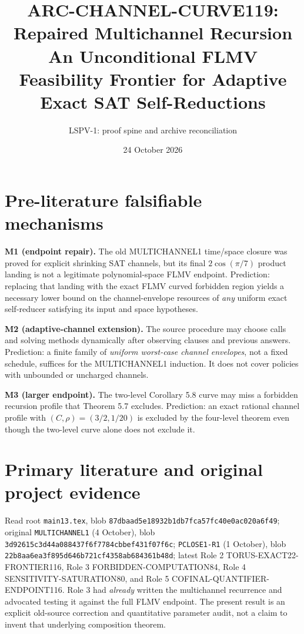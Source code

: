 \documentclass[11pt]{article}
\title{ARC-CHANNEL-CURVE119: Repaired Multichannel Recursion\\
\large An Unconditional FLMV Feasibility Frontier for Adaptive Exact SAT Self-Reductions}
\author{LSPV-1: proof spine and archive reconciliation}
\date{24 October 2026}
\begin{document}
\maketitle
\begin{center}\end{center}

\section{Pre-literature falsifiable mechanisms}
\noindent\textbf{M1 (endpoint repair).}
The old MULTICHANNEL1 time/space closure was proved for explicit shrinking SAT channels, but its final $2\cos(\pi/7)$ product landing is not a legitimate polynomial-space FLMV endpoint. Prediction: replacing that landing with the exact FLMV curved forbidden region yields a necessary lower bound on the channel-envelope resources of \emph{any} uniform exact self-reducer satisfying its input and space hypotheses.

\par\noindent\textbf{M2 (adaptive-channel extension).}
The source procedure may choose calls and solving methods dynamically after observing clauses and previous answers. Prediction: a finite family of \emph{uniform worst-case channel envelopes}, not a fixed schedule, suffices for the MULTICHANNEL1 induction. It does not cover policies with unbounded or uncharged channels.

\par\noindent\textbf{M3 (larger endpoint).}
The two-level Corollary 5.8 curve may miss a forbidden recursion profile that Theorem 5.7 excludes. Prediction: an exact rational channel profile with $(C,\rho)=(3/2,1/20)$ is excluded by the four-level theorem even though the two-level curve alone does not exclude it.

\section{Primary literature and original project evidence}
Read root \texttt{main13.tex}, blob \texttt{87dbaad5e18932b1db7fca57fc40e0ac020a6f49}; original \texttt{MULTICHANNEL1} (4 October), blob \texttt{3d92615c3d44a088437f6f7784cbbef431f07f6c}; \texttt{PCLOSE1-R1} (1 October), blob \texttt{22b8aa6ea3f895d646b721cf4358ab684361b48d}; latest Role 2 TORUS-EXACT22-FRONTIER116, Role 3 FORBIDDEN-COMPUTATION84, Role 4 SENSITIVITY-SATURATION80, and Role 5 COFINAL-QUANTIFIER-ENDPOINT116. Role 3 had \emph{already} written the multichannel recurrence and advocated testing it against the full FLMV endpoint. The present result is an explicit old-source correction and quantitative parameter audit, not a claim to invent that underlying composition theorem.
\end{document}
